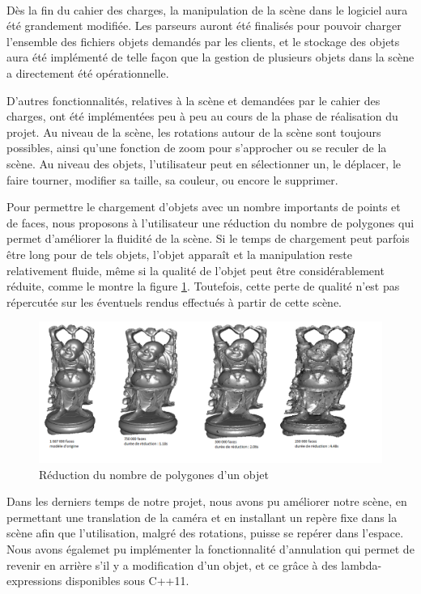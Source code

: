 \paragraph{}
Dès la fin du cahier des charges, la manipulation de la scène dans le logiciel aura été grandement modifiée. Les parseurs auront été finalisés pour pouvoir charger l'ensemble des fichiers objets demandés par les clients, et le stockage des objets aura été implémenté de telle façon que la gestion de plusieurs objets dans la scène a directement été opérationnelle. 

D'autres fonctionnalités, relatives à la scène et demandées par le cahier des charges, ont été implémentées peu à peu au cours de la phase de réalisation du projet. Au niveau de la scène, les rotations autour de la scène sont toujours possibles, ainsi qu'une fonction de zoom pour s'approcher ou se reculer de la scène. Au niveau des objets, l'utilisateur peut en sélectionner un, le déplacer, le faire tourner, modifier sa taille, sa couleur, ou encore le supprimer.

Pour permettre le chargement d'objets avec un nombre importants de points et de faces, nous proposons à l'utilisateur une réduction du nombre de polygones qui permet d'améliorer la fluidité de la scène. Si le temps de chargement peut parfois être long pour de tels objets, l'objet apparaît et la manipulation reste relativement fluide, même si la qualité de l'objet peut être considérablement réduite, comme le montre la figure \ref{fig:decimation}. Toutefois, cette perte de qualité n'est pas répercutée sur les éventuels rendus effectués à partir de cette scène.

\begin{figure}[h]
	\centering
	\includegraphics[scale=0.5]{images/reduction.png}
	\caption{\label{fig:decimation} Réduction du nombre de polygones d'un objet \protect}
\end{figure}

Dans les derniers temps de notre projet, nous avons pu améliorer notre scène, en permettant une translation de la caméra et en installant un repère fixe dans la scène afin que l'utilisation, malgré des rotations, puisse se repérer dans l'espace. Nous avons égalemet pu implémenter la fonctionnalité d'annulation qui permet de revenir en arrière s'il y a modification d'un objet, et ce grâce à des lambda-expressions disponibles sous C++11.

